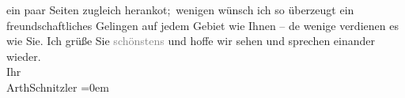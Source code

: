 \begin{ledgroupsized}[t]{13cm}
               ein paar Seiten zugleich heranko{\geminationm}t; wenigen wünsch ich
               so überzeugt ein freundschaftliches Gelingen auf jedem Gebiet wie Ihnen – de{\geminationn} wenige verdienen es wie Sie.\pend
           \pstart
           Ich grüße Sie \textcolor{gray}{schönstens} und hoffe wir sehen und sprechen
               einander wieder.{\\[\baselineskip]}Ihr{\\[\baselineskip]}\spacefill\mbox{ArthSchnitzler}\pend
           \leftskip=0em{}
         
         \endnumbering{}\end{ledgroupsized}  \newcommand{\dateiname}{L02536}\newcommand{\titel}{Arthur Schnitzler an Robert Adam, 12. 6. 1930}\newcommand{\editorInnen}{Martin Anton Müller und Gerd-Hermann Susen}
      
